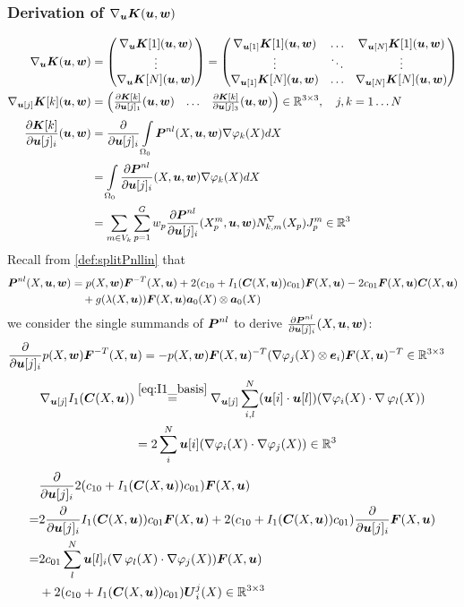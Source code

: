 \subsubsection{Derivation of $\nabla_{\vu}\vK(\vu,\vw)$}
\begin{align*}
	\nabla_{\vu}\vK(\vu,\vw) &= \m{\nabla_{\vu}\vK[1](\vu,\vw)\\ \vdots \\ \nabla_{\vu}\vK[N](\vu,\vw)}
	 = \m{\nabla_{\vu[1]}\vK[1](\vu,\vw) & \ldots & \nabla_{\vu[N]}\vK[1](\vu,\vw)\\
	 	\vdots & \ddots & \vdots\\
	   \nabla_{\vu[1]}\vK[N](\vu,\vw) & \ldots & \nabla_{\vu[N]}\vK[N](\vu,\vw)}\\
	\nabla_{\vu[j]}\vK[k](\vu,\vw) &=\m{\d{\vK[k]}{\vu[j]_1}(\vu,\vw) & \ldots & \d{\vK[k]}{\vu[j]_3}(\vu,\vw)}\in\R^{3\times 3},\quad j,k=1\ldots N\\
	\d{\vK[k]}{\vu[j]_i}(\vu,\vw) &= \d{}{\vu[j]_i} \intor\vPnl(X,\vu,\vw)\dpk dX\\
		&=  \intor\d{\vPnl}{\vu[j]_i}(X,\vu,\vw) \dpk dX\\
		&= \sumvk\sumgp w_p \d{\vPnl}{\vu[j]_i}(\pmp,\vu,\vw) \dNkmp\jmp\in\R^3
\end{align*}
Recall from \eqref{def:splitPnllin} that
\begin{align*}
\vPnl(X,\vu,\vw) &= p(X,\vw)\vF^{-T}(X,\vu) + 2(c_{10} + I_1(\vC(X,\vu))c_{01})\vF(X,\vu) - 2c_{01}\vF(X,\vu)\vC(X,\vu)\\
	     &\quad+g(\la(X,\vu))\vF(X,\vu)\va_0(X)\otimes\va_0(X)
\end{align*}
we consider the single summands of $\vPnl$ to derive $\d{\vPnl}{\vu[j]_i}(X,\vu,\vw)$:
\begin{align*}
	 \d{}{\vu[j]_i}p(X,\vw)\vF^{-T}(X,\vu) &= -p(X,\vw)\vF(X,\vu)^{-T}(\dpj\otimes\ve_i)\vF(X,\vu)^{-T}\in\R^{3\times 3}
\end{align*}
\begin{align*}
	\nabla_{\vu[j]}I_1(\vC(X,\vu)) &\re{eq:I1_basis} \nabla_{\vu[j]}\suml{i,l}{N} (\vu[i] \cdot \vu[l])(\dpi \cdot \divergence\varphi_l(X))\\
	&= 2\suml{i}{N} \vu[i](\dpi \cdot \dpj) \in\R^3
\end{align*}
\begin{align*}	 
	 &\d{}{\vu[j]_i}2(c_{10} + I_1(\vC(X,\vu))c_{01})\vF(X,\vu)\\
	 =& 2\d{}{\vu[j]_i}I_1(\vC(X,\vu))c_{01}\vF(X,\vu) + 2(c_{10} + I_1(\vC(X,\vu))c_{01})\d{}{\vu[j]_i}\vF(X,\vu)\\
	 =& 2c_{01}\suml{l}{N} \vu[l]_i(\divergence\varphi_l(X) \cdot \dpj)\vF(X,\vu)\\
	 &+ 2(c_{10} + I_1(\vC(X,\vu))c_{01})\vU^j_i(X)\in\R^{3\times 3}
\end{align*}
